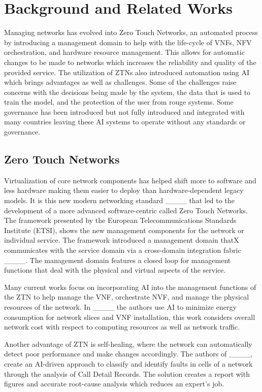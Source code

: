 \section{Background and Related Works}
Managing networks has evolved into Zero Touch Networks, an automated process by introducing a management domain to help with the life-cycle of VNFs, NFV orchestration, and hardware resource management. This allows for automatic changes to be made to networks which increases the reliability and quality of the provided service. The utilization of ZTNs also introduced automation using AI which brings advantages as well as challenges. Some of the challenges raise concerns with the decisions being made by the system, the data that is used to train the model, and the protection of the user from rouge systems. Some governance has been introduced but not fully introduced and integrated with many countries leaving these AI systems to operate without any standards or governance. 



\subsection{Zero Touch Networks}

Virtualization of core network components has helped shift more to software and less hardware making them easier to deploy than hardware-dependent legacy models. It is this new modern networking standard ____ that led to the development of a more advanced software-centric called Zero Touch Networks. The framework presented by the European Telecommunications Standards Institute (ETSI), shows the new management components for the network or individual service. The framework introduced a management domain thatX communicates with the service domain via a cross-domain integration fabric ____. The management domain features a closed loop for management functions that deal with the physical and virtual aspects of the service.

Many current works focus on incorporating AI into the management functions of the ZTN to help manage the VNF, orchestrate NVF, and manage the physical resources of the network. In ____ the authors use AI to minimize energy consumption for network slices and VNF installation, this work considers overall network cost with respect to computing resources as well as network traffic. 

Another advantage of ZTN is self-healing, where the network can automatically detect poor performance and make changes accordingly. The authors of ____, create an AI-driven approach to classify and identify faults in cells of a network through the analysis of Call Detail Records. The solution creates a report with figures and accurate root-cause analysis which reduces an expert's job. 


